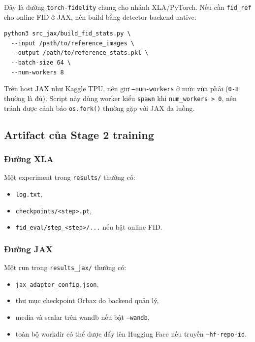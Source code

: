 Đây là đường \texttt{torch-fidelity} chung cho nhánh XLA/PyTorch. Nếu cần
\texttt{fid\_ref} cho online FID ở JAX, nên build bằng detector backend-native:

\begin{lstlisting}[style=rae]
python3 src_jax/build_fid_stats.py \
  --input /path/to/reference_images \
  --output /path/to/reference_stats.pkl \
  --batch-size 64 \
  --num-workers 8
\end{lstlisting}

Trên host JAX như Kaggle TPU, nên giữ \texttt{--num-workers} ở mức vừa phải
(\texttt{0-8} thường là đủ). Script này dùng worker kiểu \texttt{spawn} khi
\texttt{num\_workers > 0}, nên tránh được cảnh báo \texttt{os.fork()} thường
gặp với JAX đa luồng.

\subsection{Artifact của Stage 2 training}

\subsubsection{Đường XLA}

Một experiment trong \texttt{results/} thường có:

\begin{itemize}[leftmargin=1.5em]
  \item \texttt{log.txt},
  \item \texttt{checkpoints/<step>.pt},
  \item \texttt{fid\_eval/step\_<step>/...} nếu bật online FID.
\end{itemize}

\subsubsection{Đường JAX}

Một run trong \texttt{results\_jax/} thường có:

\begin{itemize}[leftmargin=1.5em]
  \item \texttt{jax\_adapter\_config.json},
  \item thư mục checkpoint Orbax do backend quản lý,
  \item media và scalar trên wandb nếu bật \texttt{--wandb},
  \item toàn bộ workdir có thể được đẩy lên Hugging Face nếu truyền
  \texttt{--hf-repo-id}.
\end{itemize}

